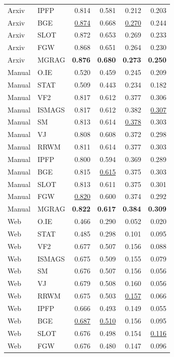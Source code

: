 {\begin{longtable}{llrrrr}
Arxiv & IPFP & 0.814 & 0.581 & 0.212 & 0.203 \\
Arxiv & BGE & \underline{0.874} & 0.668 & \underline{0.270} & 0.244 \\
Arxiv & SLOT & 0.872 & 0.653 & 0.269 & 0.233 \\
Arxiv & FGW & 0.868 & 0.651 & 0.264 & 0.230 \\
Arxiv & MGRAG & \textbf{0.876} & \textbf{0.680} & \textbf{0.273} & \textbf{0.250} \\
\midrule
Manual & O.IE & 0.520 & 0.459 & 0.245 & 0.209 \\
Manual & STAT & 0.509 & 0.443 & 0.234 & 0.182 \\
Manual & VF2 & 0.817 & 0.612 & 0.377 & 0.306 \\
Manual & ISMAGS & 0.817 & 0.612 & 0.382 & \underline{0.307} \\
Manual & SM & 0.813 & 0.614 & \underline{0.378} & 0.303 \\
Manual & VJ & 0.808 & 0.608 & 0.372 & 0.298 \\
Manual & RRWM & 0.811 & 0.614 & 0.377 & 0.303 \\
Manual & IPFP & 0.800 & 0.594 & 0.369 & 0.289 \\
Manual & BGE & 0.815 & \underline{0.615} & 0.375 & 0.303 \\
Manual & SLOT & 0.813 & 0.611 & 0.375 & 0.301 \\
Manual & FGW & \underline{0.820} & 0.600 & 0.374 & 0.292 \\
Manual & MGRAG & \textbf{0.822} & \textbf{0.617} & \textbf{0.384} & \textbf{0.309} \\
\midrule
Web & O.IE & 0.466 & 0.290 & 0.052 & 0.020 \\
Web & STAT & 0.485 & 0.298 & 0.101 & 0.095 \\
Web & VF2 & 0.677 & 0.507 & 0.156 & 0.088 \\
Web & ISMAGS & 0.675 & 0.509 & 0.155 & 0.079 \\
Web & SM & 0.676 & 0.507 & 0.156 & 0.056 \\
Web & VJ & 0.679 & 0.508 & 0.160 & 0.056 \\
Web & RRWM & 0.675 & 0.503 & \underline{0.157} & 0.066 \\
Web & IPFP & 0.666 & 0.493 & 0.149 & 0.055 \\
Web & BGE & \underline{0.687} & \underline{0.510} & 0.156 & 0.095 \\
Web & SLOT & 0.676 & 0.498 & 0.154 & \underline{0.116} \\
Web & FGW & 0.676 & 0.480 & 0.147 & 0.096 \\

\end{longtable}}
